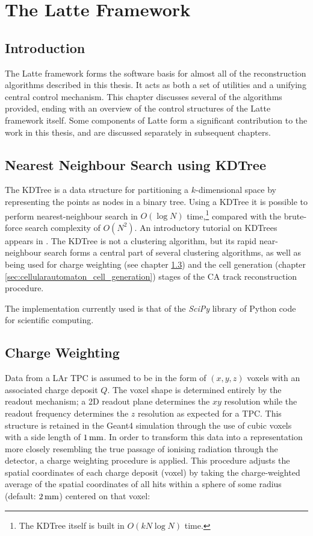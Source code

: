\chapter{The Latte Framework}

\section{Introduction}
The Latte framework forms the software basis for almost all of the reconstruction algorithms described in this thesis. It acts as both a set of utilities and a unifying central control mechanism. This chapter discusses several of the algorithms provided, ending with an overview of the control structures of the Latte framework itself. Some components of Latte form a significant contribution to the work in this thesis, and are discussed separately in subsequent chapters.

\section{Nearest Neighbour Search using \acs{KDTree}}\label{sec:latte_kdtree}
The \ac{KDTree} is a data structure for partitioning a $k$-dimensional space by representing the points as nodes in a binary tree. Using a \ac{KDTree} it is possible to perform nearest-neighbour search in $O(\log N)$ time\citep{Bentley1975},\footnote{The KDTree itself is built in $O(kN\log N)$ time.} compared with the brute-force search complexity of $O(N^2)$. An introductory tutorial on \aclp{KDTree} appears in \citep{Moore1991}. The \ac{KDTree} is not a clustering algorithm, but its rapid near-neighbour search forms a central part of several clustering algorithms, as well as being used for charge weighting (see chapter \ref{sec:cellularautomaton_charge_weighting}) and the cell generation (chapter \ref{sec:cellularautomaton_cell_generation}) stages of the \acl{CA} track reconstruction procedure.

The implementation currently used is that of the \emph{SciPy}\citep{SciPy} library of Python code for scientific computing.

\section{Charge Weighting}\label{sec:cellularautomaton_charge_weighting}
Data from a \ac{LAr TPC} is assumed to be in the form of $(x, y, z)$ voxels with an associated charge deposit $Q$. The voxel shape is determined entirely by the readout mechanism; a 2D readout plane determines the $xy$ resolution while the readout frequency determines the $z$ resolution as expected for a \ac{TPC}. This structure is retained in the Geant4 simulation through the use of cubic voxels with a side length of $1\,\mathrm{mm}$. In order to transform this data into a representation more closely resembling the true passage of ionising radiation through the detector, a charge weighting procedure is applied. This procedure adjusts the spatial coordinates of each charge deposit (voxel) by taking the charge-weighted average of the spatial coordinates of all hits within a sphere of some radius (default: $2\,\mathrm{mm}$) centered on that voxel:

